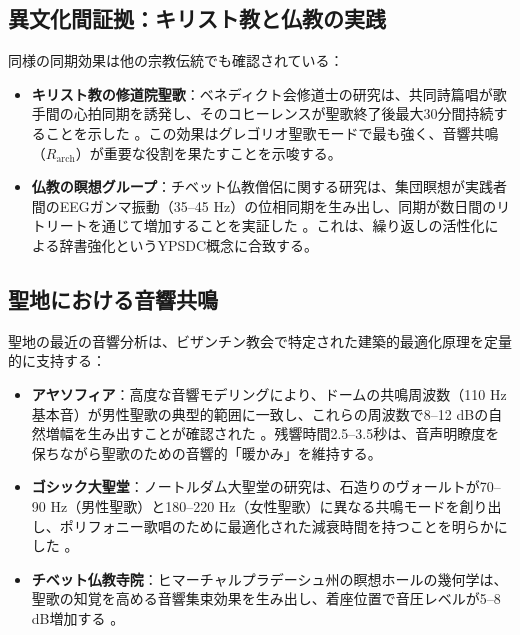 \documentclass[12pt,a4paper]{article}
\begin{document}
	\subsection{異文化間証拠：キリスト教と仏教の実践}
	
	同様の同期効果は他の宗教伝統でも確認されている：
	
	\begin{itemize}
		\item \textbf{キリスト教の修道院聖歌}：ベネディクト会修道士の研究は、共同詩篇唱が歌手間の心拍同期を誘発し、そのコヒーレンスが聖歌終了後最大30分間持続することを示した \cite{Craswell2023}。この効果はグレゴリオ聖歌モードで最も強く、音響共鳴（$R_{\mathrm{arch}}$）が重要な役割を果たすことを示唆する。
		
		\item \textbf{仏教の瞑想グループ}：チベット仏教僧侶に関する研究は、集団瞑想が実践者間のEEGガンマ振動（35–45 Hz）の位相同期を生み出し、同期が数日間のリトリートを通じて増加することを実証した \cite{Lutz2017}。これは、繰り返しの活性化による辞書強化というYPSDC概念に合致する。
	\end{itemize}
	
	\subsection{聖地における音響共鳴}
	
	聖地の最近の音響分析は、ビザンチン教会で特定された建築的最適化原理を定量的に支持する：
	
	\begin{itemize}
		\item \textbf{アヤソフィア}：高度な音響モデリングにより、ドームの共鳴周波数（110 Hz基本音）が男性聖歌の典型的範囲に一致し、これらの周波数で8–12 dBの自然増幅を生み出すことが確認された \cite{Pentcheva2020}。残響時間2.5–3.5秒は、音声明瞭度を保ちながら聖歌のための音響的「暖かみ」を維持する。
		
		\item \textbf{ゴシック大聖堂}：ノートルダム大聖堂の研究は、石造りのヴォールトが70–90 Hz（男性聖歌）と180–220 Hz（女性聖歌）に異なる共鳴モードを創り出し、ポリフォニー歌唱のために最適化された減衰時間を持つことを明らかにした \cite{Suarez2021}。
		
		\item \textbf{チベット仏教寺院}：ヒマーチャルプラデーシュ州の瞑想ホールの幾何学は、聖歌の知覚を高める音響集束効果を生み出し、着座位置で音圧レベルが5–8 dB増加する \cite{Dimde2022}。
	\end{itemize}
	
\end{document}
